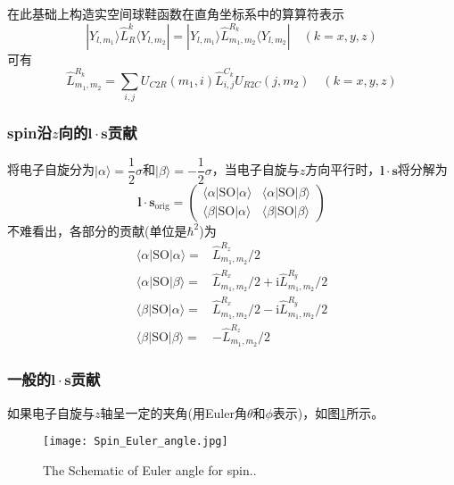 \documentclass[10pt, oneside, a4paper]{article}      %
\begin{document}
在此基础上构造实空间球鞋函数在直角坐标系中的算算符表示
\begin{displaymath}
	|Y_{l,m_1}\rangle\hat{L}_R^{k}\langle Y_{l,m_2}|=|Y_{l,m_1}\rangle\hat{L}_{m_1,m_2}^{R_k}\langle Y_{l,m_2}| \quad (k=x,y,z)
\end{displaymath}
可有
\begin{displaymath}
	\hat{L}_{m_1,m_2}^{R_k}=\sum_{i,j}U_{C2R}(m_1,i)\hat{L}_{i,j}^{C_k}U_{R2C}(j,m_2) \quad(k=x,y,z)
\end{displaymath}

\subsubsection{\rm{spin}沿$z$向的$\mathbf{l}\cdot\mathbf{s}$贡献}
将电子自旋分为$|\alpha\rangle=\dfrac12\sigma$和$|\beta\rangle=-\dfrac12\sigma$，当电子自旋与$z$方向平行时，$\mathbf{l}\cdot\mathbf{s}$将分解为
\begin{displaymath}
	\mathbf{l}\cdot\mathbf{s}_{\mathrm{orig}}=
	\begin{pmatrix}
		\langle\alpha|\mathrm{SO}|\alpha\rangle &\langle\alpha|\mathrm{SO}|\beta\rangle \\
		\langle\beta|\mathrm{SO}|\alpha\rangle &\langle\beta|\mathrm{SO}|\beta\rangle
	\end{pmatrix}
\end{displaymath}
不难看出，各部分的贡献(单位是$\hbar^2$)为
\begin{displaymath}
	\begin{aligned}
		\langle\alpha|\mathrm{SO}|\alpha\rangle =& \hat{L}_{m_1,m_2}^{R_z}/2\\
		\langle\alpha|\mathrm{SO}|\beta\rangle =& \hat{L}_{m_1,m_2}^{R_x}/2+\mathrm{i}\hat{L}_{m_1,m_2}^{R_y}/2\\
		\langle\beta|\mathrm{SO}|\alpha\rangle =& \hat{L}_{m_1,m_2}^{R_x}/2-\mathrm{i}\hat{L}_{m_1,m_2}^{R_y}/2\\
		\langle\beta|\mathrm{SO}|\beta\rangle =& -\hat{L}_{m_1,m_2}^{R_z}/2
	\end{aligned}
\end{displaymath}

\subsubsection{一般的$\mathbf{l}\cdot\mathbf{s}$贡献}
如果电子自旋与$z$轴呈一定的夹角(用\textrm{Euler}角$\theta$和$\phi$表示)，如图\ref{Fig:Euler_Angle}所示。
\begin{figure}[h!]
\centering
\vspace{-0.3in}
\texttt{[image: Spin\_Euler\_angle.jpg]}
\caption{\small\textrm{The Schematic of Euler angle for spin.}.}%
\label{Fig:Euler_Angle}
\end{figure}
\end{document}
